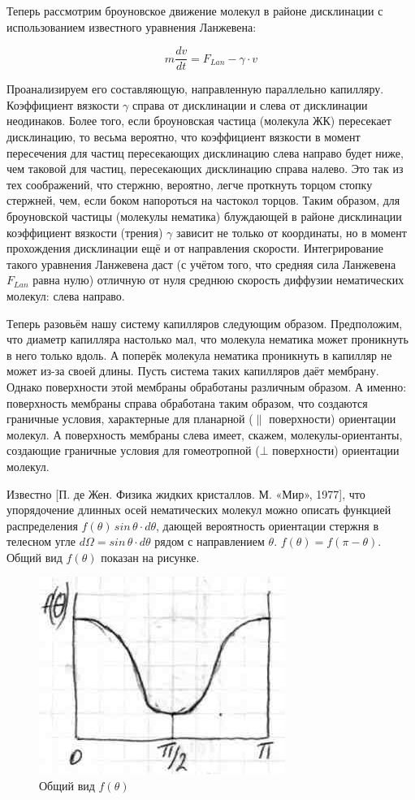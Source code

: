 \documentclass[11pt]{article}
\begin{document}
    Теперь рассмотрим броуновское движение молекул в районе дисклинации с
использованием известного уравнения Ланжевена:

\[m\frac{dv}{dt}=F_{Lan}-\gamma \cdot v\]

Проанализируем его составляющую, направленную параллельно капилляру.
Коэффициент вязкости \(\gamma\) справа от дисклинации и слева от
дисклинации неодинаков. Более того, если броуновская частица (молекула
ЖК) пересекает дисклинацию, то весьма вероятно, что коэффициент вязкости
в момент пересечения для частиц пересекающих дисклинацию слева направо
будет ниже, чем таковой для частиц, пересекающих дисклинацию справа
налево. Это так из тех соображений, что стержню, вероятно, легче
проткнуть торцом стопку стержней, чем, если боком напороться на частокол
торцов. Таким образом, для броуновской частицы (молекулы нематика)
блуждающей в районе дисклинации коэффициент вязкости (трения) \(\gamma\)
зависит не только от координаты, но в момент прохождения дисклинации ещё
и от направления скорости. Интегрирование такого уравнения Ланжевена
даст (с учётом того, что средняя сила Ланжевена \(F_{Lan}\) равна нулю)
отличную от нуля среднюю скорость диффузии нематических молекул: слева
направо.

    Теперь разовьём нашу систему капилляров следующим образом. Предположим,
что диаметр капилляра настолько мал, что молекула нематика может
проникнуть в него только вдоль. А поперёк молекула нематика проникнуть в
капилляр не может из-за своей длины. Пусть система таких капилляров даёт
мембрану. Однако поверхности этой мембраны обработаны различным образом.
А именно: поверхность мембраны справа обработана таким образом, что
создаются граничные условия, характерные для планарной (\(\parallel\)
поверхности) ориентации молекул. А поверхность мембраны слева имеет,
скажем, молекулы-ориентанты, создающие граничные условия для
гомеотропной (\(\bot\) поверхности) ориентации молекул.

Известно {[}П. де Жен. Физика жидких кристаллов. М. «Мир», 1977{]}, что
упорядочение длинных осей нематических молекул можно описать функцией
распределения \(f\left(\theta\right)\,sin\,\theta \cdot d\theta\),
дающей вероятность ориентации стержня в телесном угле
\(d\Omega = sin\,\theta \cdot d\theta\) рядом с направлением \(\theta\).
\(f\left(\theta\right) = f\left(\pi - \theta\right)\). Общий вид
\(f\left(\theta\right)\) показан на рисунке.

\begin{figure}
\centering
\includegraphics{clip_image024.jpg}
\caption{Общий вид
\(f\left(\theta\right)\)}
\end{figure}
\end{document}
